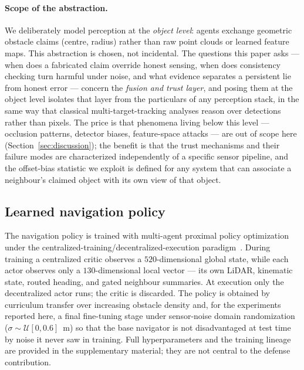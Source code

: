\paragraph{Scope of the abstraction.}
We deliberately model perception at the \emph{object level}: agents
exchange geometric obstacle claims (centre, radius) rather than raw point
clouds or learned feature maps. This abstraction is chosen, not incidental.
The questions this paper asks --- when does a fabricated claim override
honest sensing, when does consistency checking turn harmful under noise,
and what evidence separates a persistent lie from honest error --- concern
the \emph{fusion and trust layer}, and posing them at the object level
isolates that layer from the particulars of any perception stack, in the
same way that classical multi-target-tracking analyses reason over
detections rather than pixels. The price is that phenomena living below
this level --- occlusion patterns, detector biases, feature-space attacks
--- are out of scope here (Section~\ref{sec:discussion}); the benefit is
that the trust mechanisms and their failure modes are characterized
independently of a specific sensor pipeline, and the offset-bias statistic
we exploit is defined for any system that can associate a neighbour's
claimed object with its own view of that object.

\subsection{Learned navigation policy}\label{sec:methods-policy}
The navigation policy is trained with multi-agent proximal policy
optimization under the centralized-training/decentralized-execution
paradigm~\cite{yu2022mappo,schulman2017ppo}. During training a centralized
critic observes a $520$-dimensional global state, while each actor observes
only a $130$-dimensional local vector --- its own LiDAR, kinematic state,
routed heading, and gated neighbour summaries. At execution only the
decentralized actor runs; the critic is discarded. The policy is obtained by
curriculum transfer over increasing obstacle density and, for the
experiments reported here, a final fine-tuning stage under sensor-noise
domain randomization ($\sigma\sim\mathcal{U}[0,0.6]$~m) so that the base
navigator is not disadvantaged at test time by noise it never saw in
training. Full hyperparameters and the training lineage are provided in the
supplementary material; they are not central to the defense contribution.


